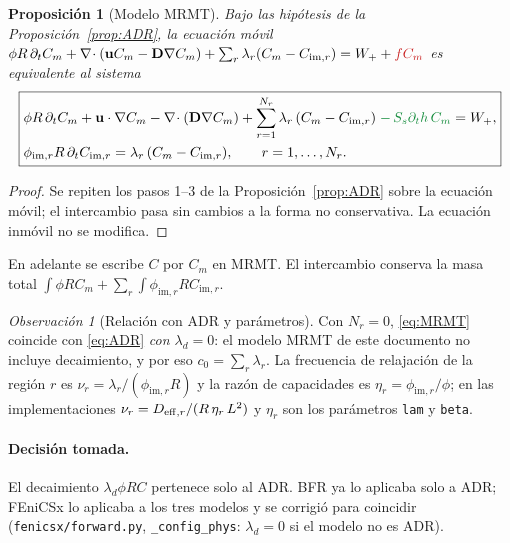 \documentclass[11pt]{article}
\numberwithin{equation}{section}
\theoremstyle{plain}
\newtheorem{proposition}[theorem]{Proposición}
\theoremstyle{definition}
\theoremstyle{remark}
\newtheorem*{remark}{Observación}
\newcommand{\bu}{\mathbf{u}}
\newcommand{\bD}{\mathbf{D}}
\newcommand{\im}{\mathrm{im}}
\newcommand{\sumi}[1]{{\color{cSum}#1}}
\newcommand{\alm}[1]{{\color{cAlm}#1}}
\begin{document}
\begin{proposition}[Modelo MRMT]\label{prop:MRMT}
Bajo las hipótesis de la Proposición~\ref{prop:ADR}, la ecuación móvil
$\phi R\,\partial_tC_m+\nabla\!\cdot(\bu C_m-\bD\nabla C_m)+\sum_r\lambda_r(C_m-C_{\im,r})=W_++\sumi{fC_m}$
es equivalente al sistema
\begin{equation}
\boxed{\begin{aligned}
&\phi R\,\partial_tC_m+\bu\cdot\nabla C_m-\nabla\!\cdot(\bD\nabla C_m)
+\sum_{r=1}^{N_r}\lambda_r\,(C_m-C_{\im,r})\;\alm{-\,S_s\partial_th\,C_m}=W_+,\\
&\phi_{\im,r}R\,\partial_tC_{\im,r}=\lambda_r\,(C_m-C_{\im,r}),\qquad r=1,\dots,N_r .
\end{aligned}}
\label{eq:MRMT}
\end{equation}
\end{proposition}
\begin{proof}
Se repiten los pasos 1--3 de la Proposición~\ref{prop:ADR} sobre la ecuación móvil; el intercambio pasa sin cambios a la
forma no conservativa. La ecuación inmóvil no se modifica.
\end{proof}
En adelante se escribe $C$ por $C_m$ en MRMT. El intercambio conserva la masa total $\int\phi RC_m+\sum_r\int\phi_{\im,r}RC_{\im,r}$.

\begin{remark}[Relación con ADR y parámetros]
Con $N_r=0$, \eqref{eq:MRMT} coincide con \eqref{eq:ADR} \emph{con $\lambda_d=0$}: el modelo MRMT de este documento no incluye decaimiento, y por eso $c_0=\sum_r\lambda_r$.
La frecuencia de relajación de la región $r$ es $\nu_r=\lambda_r/(\phi_{\im,r}R)$ y la razón de capacidades es $\eta_r=\phi_{\im,r}/\phi$; en las implementaciones
$\nu_r=D_{{\rm eff},r}/(R\,\eta_r\,L^2)$ y $\eta_r$ son los parámetros \texttt{lam} y \texttt{beta}.
\end{remark}
\paragraph{Decisión tomada.} El decaimiento $\lambda_d\phi RC$ pertenece solo al ADR. BFR ya lo aplicaba solo a ADR; FEniCSx lo aplicaba a los tres modelos y se corrigió para coincidir (\texttt{fenicsx/forward.py}, \texttt{\_config\_phys}: $\lambda_d=0$ si el modelo no es ADR).
\end{document}
